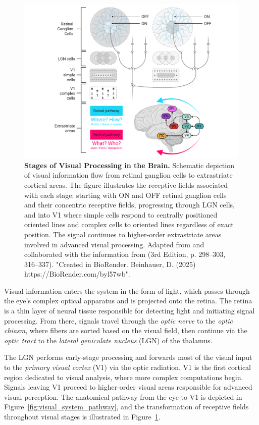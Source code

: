 \begin{figure}
    \centering
    \includegraphics[width=\linewidth]{img/early_visual_processing.pdf}
    \caption{\textbf{Stages of Visual Processing in the Brain.} Schematic depiction of visual information flow from retinal ganglion cells to extrastriate cortical areas. The figure illustrates the receptive fields associated with each stage: starting with ON and OFF retinal ganglion cells and their concentric receptive fields, progressing through LGN cells, and into V1 where simple cells respond to centrally positioned oriented lines and complex cells to oriented lines regardless of exact position. The signal continues to higher-order extrastriate areas involved in advanced visual processing. Adapted from \citet{felleman_distributed_1991} and collaborated with the information from \citet{bear2020neuroscience} (3rd Edition, p. 298--303, 316--337). "Created in BioRender. Beinhauer, D. (2025) https://BioRender.com/byl57wb".}
    \label{fig:early_vis_processing}
\end{figure}

Visual information enters the system in the form of light, which passes through the eye's complex optical apparatus and is projected onto the retina. The retina is a thin layer of neural tissue responsible for detecting light and initiating signal processing. From there, signals travel through the \emph{optic nerve} to the \emph{optic chiasm}, where fibers are sorted based on the visual field, then continue via the \emph{optic tract} to the \emph{lateral geniculate nucleus} (LGN) of the thalamus.

The LGN performs early-stage processing and forwards most of the visual input to the \emph{primary visual cortex} (V1) via the optic radiation. V1 is the first cortical region dedicated to visual analysis, where more complex computations begin. Signals leaving V1 proceed to higher-order visual areas responsible for advanced visual perception. The anatomical pathway from the eye to V1 is depicted in Figure~\ref{fig:visual_system_pathway}, and the transformation of receptive fields throughout visual stages is illustrated in Figure~\ref{fig:early_vis_processing}.

